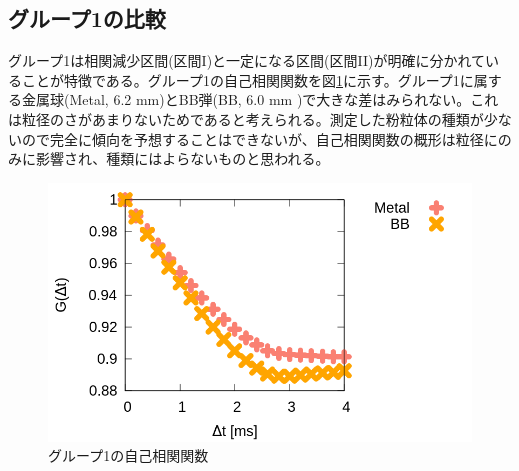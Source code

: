 \documentclass[a4paper,10pt,twocolumn,dvipdfmx]{jsarticle}
\newcommand{\II}{I\hspace{-.1em}I}
\begin{document}
\subsection{グループ1の比較}
グループ1は相関減少区間(区間I)と一定になる区間(区間\II )が明確に分かれていることが特徴である。グループ1の自己相関関数を図\ref{fig:one}に示す。グループ1に属する金属球(Metal, 6.2 mm)とBB弾(BB, 6.0 mm )で大きな差はみられない。これは粒径のさがあまりないためであると考えられる。測定した粉粒体の種類が少ないので完全に傾向を予想することはできないが、自己相関関数の概形は粒径にのみに影響され、種類にはよらないものと思われる。
\begin{figure}[H]
	\includegraphics[scale=0.4]{one.png}
	\caption{グループ1の自己相関関数}
	\label{fig:one}
\end{figure}
\end{document}
